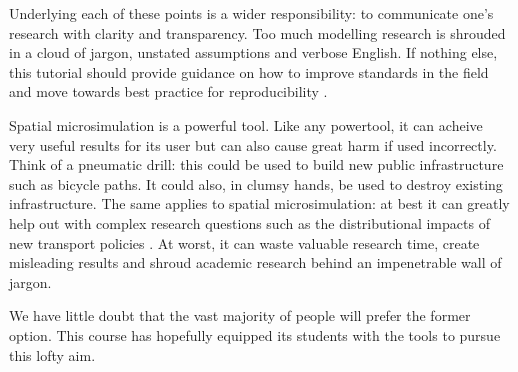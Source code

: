 \documentclass[a4paper, 11pt, twoside]{article}
\begin{document}
Underlying each of these points is a wider responsibility: to communicate one's research
with clarity and transparency. Too much modelling research is shrouded in a cloud of jargon,
unstated assumptions and verbose English. If nothing else, this tutorial should
provide guidance on how to improve standards in the field and move towards best practice
for reproducibility \citep{Peng2006}.

Spatial microsimulation is a powerful tool.
Like any powertool, it can acheive very useful results for its user
but can also cause great harm if used incorrectly. 
Think of a pneumatic drill: this could be used to build new
public infrastructure such as bicycle paths. It could also,
in clumsy hands, be used to destroy existing infrastructure.
The same applies to spatial microsimulation:
at best it can greatly help out with complex research questions such
as the distributional impacts of new transport policies \citep{Lovelace2014-jtg}.
At worst, it can waste valuable research time, create misleading results
and shroud academic research behind an impenetrable wall of jargon.

We have little doubt that the vast majority of
people will prefer the former option. This course has hopefully
equipped its students with
the tools to pursue this lofty aim.
\end{document}
